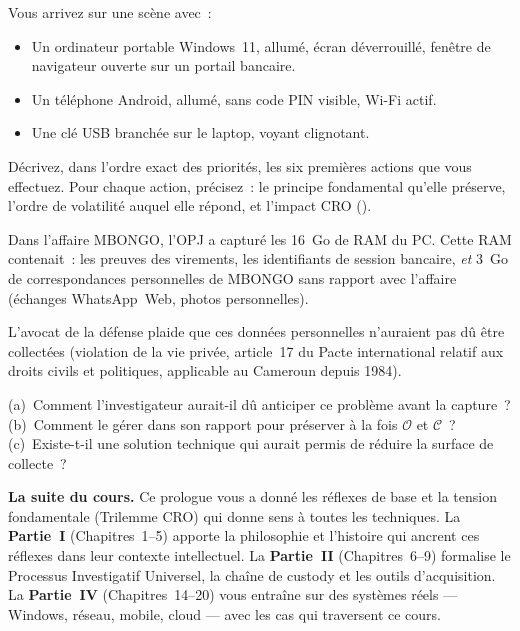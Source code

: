\begin{boxexo}[title={\ding{45}\quad Exercice P.2 --- Scénario de triage \niveaumoyen}]
Vous arrivez sur une scène avec~:
\begin{itemize}
    \item Un ordinateur portable Windows~11, allumé, écran déverrouillé,
          fenêtre de navigateur ouverte sur un portail bancaire.
    \item Un téléphone Android, allumé, sans code PIN visible, Wi-Fi actif.
    \item Une clé USB branchée sur le laptop, voyant clignotant.
\end{itemize}
Décrivez, dans l'ordre exact des priorités, les six premières actions que
vous effectuez. Pour chaque action, précisez~: le principe fondamental
qu'elle préserve, l'ordre de volatilité auquel elle répond, et l'impact
CRO ().
\end{boxexo}

\begin{boxexo}[title={\ding{45}\quad Exercice P.3 --- Réflexion CRO \niveauexpert}]
Dans l'affaire MBONGO, l'OPJ a capturé les 16~Go de RAM du PC. Cette RAM
contenait~: les preuves des virements, les identifiants de session bancaire,
\emph{et} 3~Go de correspondances personnelles de MBONGO sans rapport avec
l'affaire (échanges WhatsApp~Web, photos personnelles).

L'avocat de la défense plaide que ces données personnelles n'auraient pas
dû être collectées (violation de la vie privée, article~17 du Pacte
international relatif aux droits civils et politiques, applicable au
Cameroun depuis 1984).

\smallskip
(a)~Comment l'investigateur aurait-il dû anticiper ce problème avant
la capture~?\\
(b)~Comment le gérer dans son rapport pour préserver à la fois
$\mathcal{O}$ et $\mathcal{C}$~?\\
(c)~Existe-t-il une solution technique qui aurait permis de réduire
la surface de collecte~?
\end{boxexo}

\bigskip

\begin{boxinfo}
\textbf{La suite du cours.} Ce prologue vous a donné les réflexes de base
et la tension fondamentale (Trilemme CRO) qui donne sens à toutes les
techniques. La \textbf{Partie~I} (Chapitres~1--5) apporte la philosophie
et l'histoire qui ancrent ces réflexes dans leur contexte intellectuel.
La \textbf{Partie~II} (Chapitres~6--9) formalise le Processus Investigatif
Universel, la chaîne de custody et les outils d'acquisition. La
\textbf{Partie~IV} (Chapitres~14--20) vous entraîne sur des systèmes réels
--- Windows, réseau, mobile, cloud --- avec les cas qui traversent ce cours.
\end{boxinfo}

